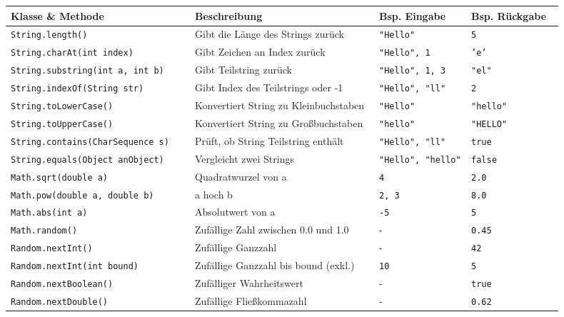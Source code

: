 \documentclass[a4paper,10pt, dvipsnames]{report}
\newcommand{\javaInLine}[1]{\texttt{#1}}
\begin{document}
\begin{longtable}{|p{0.3\linewidth}|p{0.3\linewidth}|p{0.15\linewidth}|p{0.15\linewidth}|}
\hline
\textbf{Klasse \& Methode} & \textbf{Beschreibung} & \textbf{Bsp. Eingabe} & \textbf{Bsp. Rückgabe} \\
\hline
\endhead

\javaInLine{String.length()} & Gibt die Länge des Strings zurück & \javaInLine{"Hello"} & \javaInLine{5} \\
\javaInLine{String.charAt(int index)} & Gibt Zeichen an Index zurück & \javaInLine{"Hello", 1} & \javaInLine{'e'} \\
\javaInLine{String.substring(int a, int b)} & Gibt Teilstring zurück & \javaInLine{"Hello", 1, 3} & \javaInLine{"el"} \\
\javaInLine{String.indexOf(String str)} & Gibt Index des Teilstrings oder -1 & \javaInLine{"Hello", "ll"} & \javaInLine{2} \\
\javaInLine{String.toLowerCase()} & Konvertiert String zu Kleinbuchstaben & \javaInLine{"Hello"} & \javaInLine{"hello"} \\
\javaInLine{String.toUpperCase()} & Konvertiert String zu Großbuchstaben & \javaInLine{"hello"} & \javaInLine{"HELLO"} \\
\javaInLine{String.contains(CharSequence s)} & Prüft, ob String Teilstring enthält & \javaInLine{"Hello", "ll"} & \javaInLine{true} \\
\javaInLine{String.equals(Object anObject)} & Vergleicht zwei Strings & \javaInLine{"Hello", "hello"} & \javaInLine{false} \\
\hline

\javaInLine{Math.sqrt(double a)} & Quadratwurzel von a & \texttt{4} & \texttt{2.0} \\
\javaInLine{Math.pow(double a, double b)} & a hoch b & \texttt{2, 3} & \texttt{8.0} \\
\javaInLine{Math.abs(int a)} & Absolutwert von a & \texttt{-5} & \texttt{5} \\
\javaInLine{Math.random()} & Zufällige Zahl zwischen 0.0 und 1.0 & - & \texttt{0.45} \\
\hline

\javaInLine{Random.nextInt()} & Zufällige Ganzzahl & - & \texttt{42} \\
\javaInLine{Random.nextInt(int bound)} & Zufällige Ganzzahl bis bound (exkl.) & \texttt{10} & \texttt{5} \\
\javaInLine{Random.nextBoolean()} & Zufälliger Wahrheitswert & - & \texttt{true} \\
\javaInLine{Random.nextDouble()} & Zufällige Fließkommazahl & - & \texttt{0.62} \\
\hline


\end{longtable}
\end{document}

